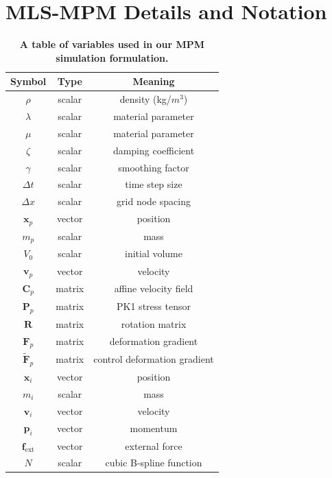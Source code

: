 \cleardoublepage
{}
\appendix
\chapter{MLS-MPM Details and Notation}  %
\label{app:mlsmpm}

\begin{table}[ht!]
    \caption[{A table of variables used in our {MPM} simulation formulation}]{\textbf{A table of variables used in our {MPM} simulation formulation.}}
    \centering
    \begin{tabular}{ccc}
    \toprule
        Symbol & Type & Meaning \\ 
    \midrule
    $\rho$ & scalar & density (kg/$m^3$)  \\ 
    $\lambda$ & scalar & material parameter \\
    $\mu$ & scalar & material parameter \\
    $\zeta$ & scalar & damping coefficient\\ 
    $\gamma$ & scalar & smoothing factor\\
    $\Delta t$ & scalar & time step size  \\
    $\Delta x$ & scalar & grid node spacing \\
    \midrule	
    $\mathbf{x}_{p}$ & vector & position \\
    $m_{p}$ & scalar & mass \\
    $V_{0}$ & scalar & initial volume \\
    $\mathbf{v}_{p}$ & vector & velocity \\
    \midrule	
    $\mathbf{C}_{p}$ & matrix & affine velocity field \\
    $\mathbf{P}_{p}$ & matrix & PK1 stress tensor \\
    $\mathbf{R}$ & matrix & rotation matrix  \\
    $\mathbf{F}_{p}$ & matrix & deformation gradient  \\
    $\mathbf{\tilde{F}}_{p}$ & matrix & control deformation gradient \\
    \midrule	
    $\mathbf{x}_{i}$ & vector & position \\
    $m_{i}$ & scalar & mass  \\
    $\mathbf{v}_{i}$ & vector & velocity \\
    $\mathbf{p}_{i}$ & vector & momentum \\
    $\mathbf{f}_{\text{ext}}$ & vector & external force  \\
    $N$ & scalar & cubic B-spline function \\
    \bottomrule
    \end{tabular}
    \vspace{1mm}
    \label{tab:mpm-syms}
    \\
\end{table}

